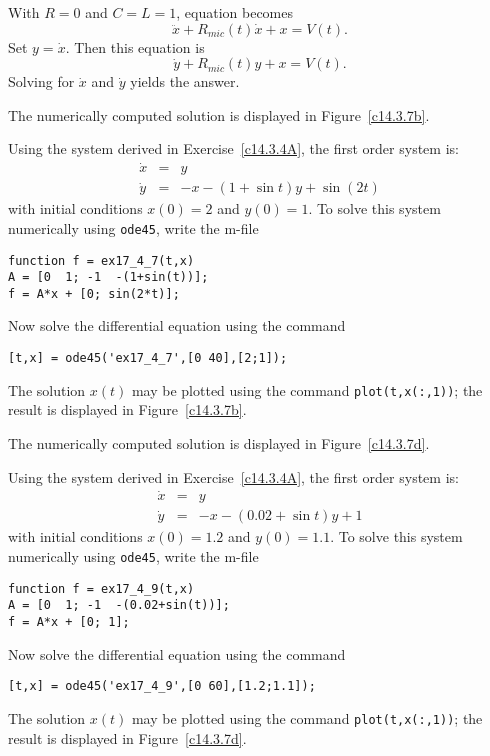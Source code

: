 With $R=0$ and $C=L=1$, equation  becomes
\[
\ddot{x} + R_{mic}(t)\dot{x} + x = V(t).
\]
Set $y=\dot{x}$.  Then this equation is
\[
\dot{y} + R_{mic}(t)y + x = V(t).
\]
Solving for $\dot{x}$ and $\dot{y}$ yields the answer. 

  \ans The numerically computed solution is displayed in 
Figure~\ref{c14.3.7b}.

\soln  Using the system  derived in 
Exercise~\ref{c14.3.4A}, the first order system is:
\begin{eqnarray*}
\dot{x} & = & y \\
\dot{y} & = & -x - (1+\sin t)y + \sin(2t)
\end{eqnarray*}
with initial conditions $x(0)=2$ and $y(0)=1$.  To solve this system numerically 
using {\tt ode45}, write the m-file
\begin{verbatim}
function f = ex17_4_7(t,x)
A = [0  1; -1  -(1+sin(t))];
f = A*x + [0; sin(2*t)];
\end{verbatim}
Now solve the differential equation using the command
\begin{verbatim}
[t,x] = ode45('ex17_4_7',[0 40],[2;1]);
\end{verbatim}
The solution $x(t)$ may be plotted using the command {\tt plot(t,x(:,1))}; the 
result is displayed in Figure~\ref{c14.3.7b}.
\begin{figure}[htb]
     \centerline{%
     }
\end{figure} 

 \ans The numerically computed solution is displayed in 
Figure~\ref{c14.3.7d}.

\soln  Using the system  derived in 
Exercise~\ref{c14.3.4A}, the first order system is:
\begin{eqnarray*}
\dot{x} & = & y \\
\dot{y} & = & -x - (0.02+\sin t)y + 1
\end{eqnarray*}
with initial conditions $x(0)=1.2$ and $y(0)=1.1$.   To solve this system numerically 
using {\tt ode45}, write the m-file
\begin{verbatim}
function f = ex17_4_9(t,x)
A = [0  1; -1  -(0.02+sin(t))];
f = A*x + [0; 1];
\end{verbatim}
Now solve the differential equation using the command
\begin{verbatim}
[t,x] = ode45('ex17_4_9',[0 60],[1.2;1.1]);
\end{verbatim}
The solution $x(t)$ may be plotted using the command {\tt plot(t,x(:,1))}; the 
result is displayed in Figure~\ref{c14.3.7d}.
\begin{figure}[htb]
     \centerline{%
     }
\end{figure} 



